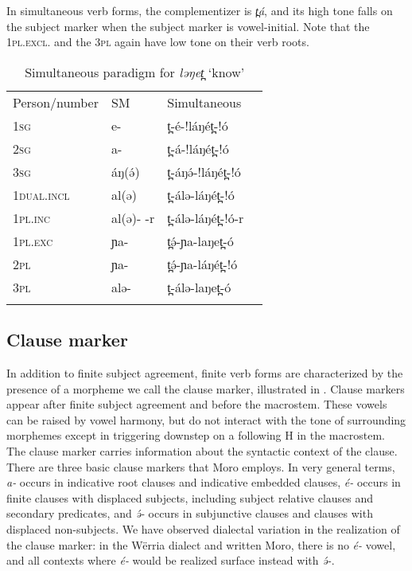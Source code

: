 In simultaneous verb forms, the complementizer is \textit{t̪á}, and its high tone falls on the subject marker when the subject marker is vowel-initial. Note that the 1\textsc{pl.excl}. and the 3\textsc{pl} again have low tone on their verb roots.  

\begin{table}
	\begin{supertabular}[t]{llll}
	\lsptoprule
Person/number &	SM 	&	Simultaneous \\
1\textsc{sg}			&	e- 	&	t̪-é-!láŋét̪-!ó  \\
2\textsc{sg} 		&	a- 	&	t̪-á-!láŋét̪-!ó  \\
3\textsc{sg}			&	áŋ(ə́) 	&	t̪-áŋə́-!láŋét̪-!ó  \\
1\textsc{dual.incl}	&	al(ə)  	&	t̪-álə-láŋét̪-!ó  \\
1\textsc{pl.inc}		&	al(ə)- -r& 	t̪-álə-láŋét̪-!ó-r  \\
1\textsc{pl.exc}		&	ɲa-  	&	t̪ə́-ɲa-laŋet̪-ó  \\
2\textsc{pl}			&	ɲa-  	&	t̪ə́-ɲa-láŋét̪-!ó  \\
3\textsc{pl} 		&	alə- 	&	t̪-álə-laŋet̪-ó  \\
	\lspbottomrule
	\end{supertabular}
	\caption{Simultaneous paradigm for \textit{ləŋet̪} `know'}
	\label{tab:ch11:agr5}
\end{table}


\subsection{Clause marker}\label{sec:ch11:clausemarker}

In addition to finite subject agreement, finite verb forms are characterized by the presence of a morpheme we call the clause marker, illustrated in .  Clause markers appear after finite subject agreement and before the macrostem. These vowels can be raised by vowel harmony, but do not interact with the tone of surrounding morphemes except in triggering downstep on a following H in the macrostem. The clause marker carries information about the syntactic context of the clause. There are three basic clause markers that Moro employs. In very general terms, \textit{a-} occurs in indicative root clauses and indicative embedded clauses, \textit{é-} occurs in finite clauses with displaced subjects, including subject relative clauses and secondary predicates, and \textit{ə́-} occurs in subjunctive clauses and clauses with displaced non-subjects. We have observed dialectal variation in the realization of the clause marker: in the W\"erria dialect and written Moro, there is no \textit{é-} vowel, and all contexts where \textit{é-} would be realized surface instead with  \textit{ə́-}. 

